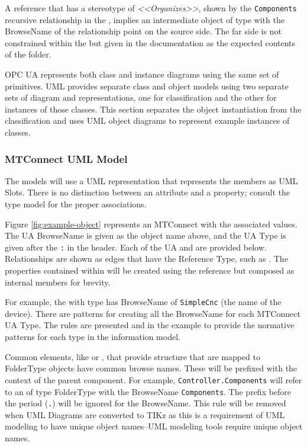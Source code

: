 A reference that has a stereotype of \textit{<<Organizes>>}, shown by the \texttt{Components} recursive relationship in the , implies an intermediate object of type  with the \gls{BrowseName} of the relationship point on the source side. The far side is not constrained within the  but given in the documentation as the expected contents of the folder.

OPC UA represents both class and instance diagrams using the same set of primitives. UML provides separate class and object models using two separate sets of diagram and representations, one for classification and the other for instances of those classes. This section separates the object instantiation from the classification and uses UML object diagrams to represent example instances of classes.

\FloatBarrier

\subsubsection{MTConnect UML Model}

The models will use a UML representation that represents the members as UML Slots. There is no distinction between an attribute and a property; consult the type model for the proper associations.



Figure \ref{fig:example-object} represents an MTConnect  with the associated values. The UA \gls{BrowseName} is given as the object name above, and the UA Type is given after the \texttt{:} in the header. Each of the UA  and  are provided below. Relationships are shown as edges that have the Reference Type, such as . The properties contained within will be created using the  reference but composed as internal members for brevity.

For example, the with type  has \gls{BrowseName} of \texttt{SimpleCnc} (the name of the device). There are patterns for creating all the \gls{BrowseName} for each MTConnect UA Type. The rules are presented and in the example to provide the normative patterns for each type in the information model.

Common elements, like  or , that provide structure that are mapped to \gls{FolderType} objects have common browse names. These will be prefixed with the context of the parent component. For example, \texttt{Controller.Components} will refer to an  of type \gls{FolderType} with the \gls{BrowseName} \texttt{Components}. The prefix before the period (\texttt{.}) will be ignored for the \gls{BrowseName}. {\color{red} This rule will be removed when UML Diagrams are converted to TIKz as this is a requirement of UML modeling to have unique object names--UML modeling tools require unique object names.}

